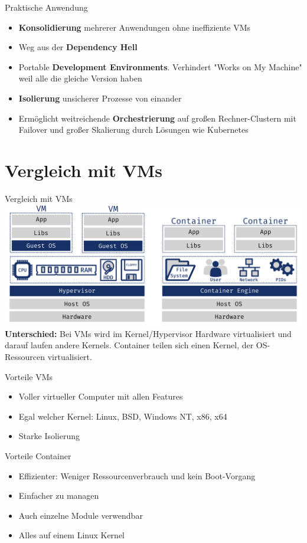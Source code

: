 \documentclass{beamer}
\begin{document}
  \begin{frame}{Praktische Anwendung}
    \begin{itemize}[<+->]
      \item \textbf{Konsolidierung} mehrerer Anwendungen ohne ineffiziente VMs
      \item Weg aus der \textbf{Dependency Hell}
      \item Portable \textbf{Development Environments}. Verhindert "Works on My Machine" weil alle die gleiche Version haben
      \item \textbf{Isolierung} unsicherer Prozesse von einander
      \item Ermöglicht weitreichende \textbf{Orchestrierung} auf großen Rechner-Clustern mit Failover und großer Skalierung durch Lösungen wie Kubernetes
    \end{itemize}
  \end{frame}


  \section{Vergleich mit VMs}

  \begin{frame}{Vergleich mit VMs}
    \includegraphics[width=\textwidth]{comparison}
    \textbf{Unterschied:} Bei VMs wird im Kernel/Hypervisor Hardware virtualisiert und darauf laufen andere Kernels. Container teilen sich einen Kernel, der OS-Ressourcen virtualisiert. 
  \end{frame}
  \begin{frame}{Vorteile VMs}
    \begin{itemize}
      \item Voller virtueller Computer mit allen Features
      \item Egal welcher Kernel: Linux, BSD, Windows NT, x86, x64
      \item Starke Isolierung
    \end{itemize}
  \end{frame}
  \begin{frame}{Vorteile Container}
    \begin{itemize}
      \item Effizienter: Weniger Ressourcenverbrauch und kein Boot-Vorgang
      \item Einfacher zu managen
      \item Auch einzelne Module verwendbar
      \item Alles auf einem Linux Kernel
    \end{itemize}
  \end{frame}
   
\end{document}
